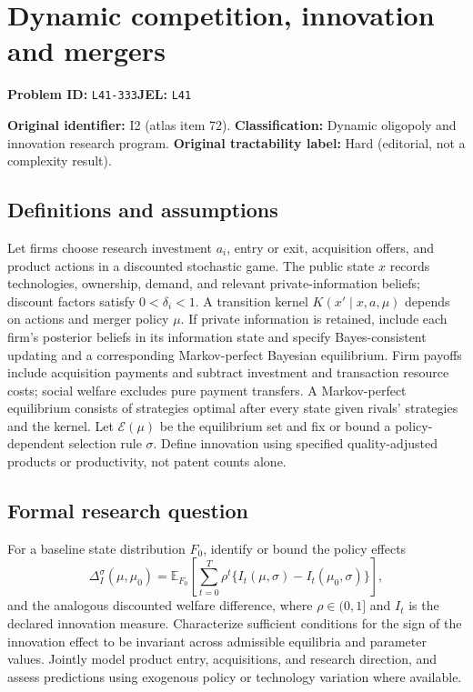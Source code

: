 \documentclass[11pt,a4paper]{article}
\begin{document}
\section*{Dynamic competition, innovation and mergers}
\textbf{Problem ID:} \texttt{L41-333}\quad \textbf{JEL:} \texttt{L41}\par
\label{problem:OP-0072}
\label{atlas:prob:I2}

\noindent\textbf{Original identifier:} I2 (atlas item 72). \textbf{Classification:} Dynamic oligopoly and innovation research program. \textbf{Original tractability label:} Hard (editorial, not a complexity result).

\subsection*{Definitions and assumptions}

Let firms choose research investment $a_i$, entry or exit, acquisition offers, and product actions in a discounted stochastic game. The public state $x$ records technologies, ownership, demand, and relevant private-information beliefs; discount factors satisfy $0<\delta_i<1$. A transition kernel $K(x'\mid x,a,\mu)$ depends on actions and merger policy $\mu$. If private information is retained, include each firm's posterior beliefs in its information state and specify Bayes-consistent updating and a corresponding Markov-perfect Bayesian equilibrium. Firm payoffs include acquisition payments and subtract investment and transaction resource costs; social welfare excludes pure payment transfers. A Markov-perfect equilibrium consists of strategies optimal after every state given rivals' strategies and the kernel. Let $\mathcal E(\mu)$ be the equilibrium set and fix or bound a policy-dependent selection rule $\sigma$. Define innovation using specified quality-adjusted products or productivity, not patent counts alone.

\subsection*{Formal research question}

For a baseline state distribution $F_0$, identify or bound the policy effects
\[
\Delta_I^{\sigma}(\mu,\mu_0)=\mathbb E_{F_0}\!\left[\sum_{t=0}^{T}\rho^t\{I_t(\mu,\sigma)-I_t(\mu_0,\sigma)\}\right],
\]
and the analogous discounted welfare difference, where $\rho\in(0,1]$ and $I_t$ is the declared innovation measure. Characterize sufficient conditions for the sign of the innovation effect to be invariant across admissible equilibria and parameter values. Jointly model product entry, acquisitions, and research direction, and assess predictions using exogenous policy or technology variation where available.
\end{document}
